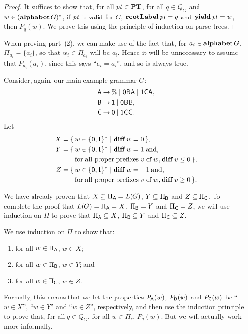 \begin{proof}
It suffices to show that, for all ${\it pt}\in\mathbf{PT}$, for all 
$q\in Q_G$ and $w\in(\mathbf{alphabet}\,G)^*$, if
${\it pt}$ is valid for $G$, $\mathbf{rootLabel}\,{\it pt} = q$ and
$\mathbf{yield}\,{\it pt} = w$, then $P_q(w)$.
We prove this using the principle of induction on parse trees.
\end{proof}

When proving part~(2), we can make use of the fact that, for
$a_i\in\mathbf{alphabet}\,G$, $\Pi_{a_i} = \{a_i\}$, so that $w_i\in\Pi_{a_i}$
will be $a_i$.  Hence it will be unnecessary to assume that
$P_{a_i}(a_i)$, since this says ``$a_i=a_i$'', and so is always true.

Consider, again, our main example grammar $G$:
\begin{align*}
\mathsf{A} &\mathbin{\to} \% \mid \mathsf{0}\mathsf{B}\mathsf{A} \mid \mathsf{1}\mathsf{C}\mathsf{A} , \\
\mathsf{B} &\mathbin{\to} \mathsf{1} \mid \mathsf{0}\mathsf{B}\mathsf{B} , \\
\mathsf{C} &\mathbin{\to} \mathsf{0} \mid \mathsf{1}\mathsf{C}\mathsf{C} .
\end{align*}
Let
\begin{align*}
X &= \{ \, w\in\{\mathsf{0,1}\}^* \mid \mathbf{diff}\,w = 0 \, \} , \\
Y &= \{ \, w\in\{\mathsf{0,1}\}^* \mid \mathbf{diff}\,w = 1\;\allowbreak\mbox{and,}\allowbreak\;\\
&\quad\hspace{.25cm}
\;\allowbreak\mbox{for all proper prefixes}\allowbreak\;v\;\allowbreak\mbox{of}\allowbreak\;w,\mathbf{diff}\,v\leq 0 \, \} , \\
Z &= \{ \, w\in\{\mathsf{0,1}\}^* \mid \mathbf{diff}\,w = -1\;\allowbreak\mbox{and,}\allowbreak\;\\
&\quad\hspace{.25cm}
\;\allowbreak\mbox{for all proper prefixes}\allowbreak\;v\;\allowbreak\mbox{of}\allowbreak\;w,\mathbf{diff}\,v\geq 0 \, \} .
\end{align*}

We have already proven that $X\subseteq\Pi_{\mathsf{A}}=L(G)$, $Y\subseteq\Pi_{\mathsf{B}}$ and
$Z\subseteq\Pi_{\mathsf{C}}$.  To complete the proof that
$L(G)=\Pi_{\mathsf{A}}=X$, $\Pi_{\mathsf{B}}=Y$ and $\Pi_{\mathsf{C}}=Z$, we will use
induction on $\Pi$ to prove that
$\Pi_{\mathsf{A}}\subseteq X$, $\Pi_{\mathsf{B}}\subseteq Y$ and $\Pi_{\mathsf{C}}\subseteq Z$.

We use induction on $\Pi$ to show that:
\begin{enumerate}[\quad(A)]
\item for all $w\in\Pi_{\mathsf{A}}$, $w\in X$;

\item for all $w\in\Pi_{\mathsf{B}}$, $w\in Y$; and

\item for all $w\in\Pi_{\mathsf{C}}$, $w\in Z$.
\end{enumerate}
Formally, this means that we let the properties $P_{\mathsf{A}}(w)$,
$P_{\mathsf{B}}(w)$ and $P_{\mathsf{C}}(w)$ be ``$w\in X$'', ``$w\in Y$'' and ``$w\in
Z$'', respectively, and then use the induction principle to prove
that, for all $q\in Q_G$, for all $w\in\Pi_q$,
$P_q(w)$.  But we will actually work more informally.

